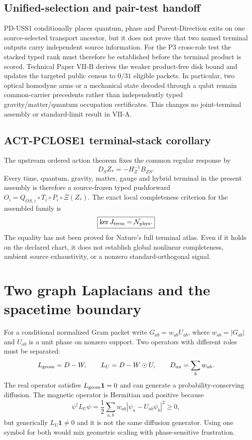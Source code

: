 \documentclass[11pt]{article}
\begin{document}
\subsection*{Unified-selection and pair-test handoff}

PD-USS1 conditionally places quantum, phase and Parent-Direction exits on one
source-selected transport ancestor, but it does not prove that two named
terminal outputs carry independent source information. For the P3
cross-role test the stacked typed rank must therefore be established before
the terminal product is scored. Technical Paper VII-B derives the weaker
product-free disk bound and updates the targeted public census to $0/31$
eligible packets. In particular, two optical homodyne arms or a mechanical
state decoded through a qubit remain common-carrier precedents rather than
independently typed gravity/matter/quantum occupation certificates. This
changes no joint-terminal assembly or standard-limit result in VII-A.

\subsection*{ACT-PCLOSE1 terminal-stack corollary}

The upstream ordered action theorem fixes the common regular response by
\[
 D_SZ_*=-H_Z^{-1}B_{ZS}.
\]
Every time, quantum, gravity, matter, gauge and hybrid terminal in the present
assembly is therefore a source-frozen typed pushforward
$O_i=Q_{OS,i}\circ T_i\circ P_i\circ\Xi(Z_*)$.  The exact local completeness
criterion for the assembled family is
\[
 \boxed{\ker J_{\rm term}=\mathcal N_{\rm phys}.}
\]
The equality has not been proved for Nature's full terminal atlas.  Even if it
holds on the declared chart, it does not establish global nonlinear
completeness, ambient source exhaustivity, or a nonzero standard-orthogonal
signal.

\section{Two graph Laplacians and the spacetime boundary}

For a conditional normalized Gram packet write
$G_{ab}=w_{ab}U_{ab}$, where $w_{ab}=|G_{ab}|$ and $U_{ab}$ is a unit phase
on nonzero support.  Two operators with different roles must be separated:
\begin{equation}
 L_{\rm geom}=D-W,
 \qquad
 L_U=D-W\odot U,
 \qquad
 D_{aa}=\sum_b w_{ab}.
 \label{eq:paperVII-two-laplacians}
\end{equation}
The real operator satisfies $L_{\rm geom}\mathbf1=0$ and can generate a
probability-conserving diffusion.  The magnetic operator is Hermitian and
positive because
\begin{equation}
 \psi^\dagger L_U\psi
 =\frac12\sum_{a,b}w_{ab}|\psi_a-U_{ab}\psi_b|^2\ge0,
 \label{eq:paperVII-magnetic-positive}
\end{equation}
but generically $L_U\mathbf1\ne0$ and it is not the same diffusion
generator.  Using one symbol for both would mix geometric scaling with
phase-sensitive frustration.
\end{document}
